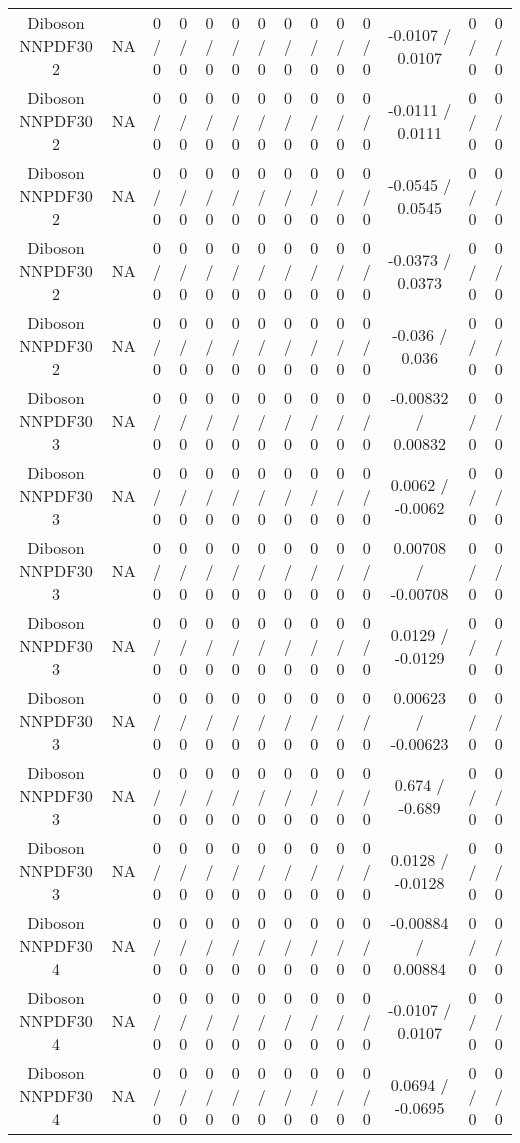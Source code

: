 \documentclass[10pt]{article}
\begin{document}
\begin{table}[htbp]
\begin{center}
\begin{tabular}{|c|c|c|c|c|c|c|c|c|c|c|c|c|c|}
  Diboson NNPDF30 2 &    NA    & 0 / 0 & 0 / 0 & 0 / 0 & 0 / 0 & 0 / 0 & 0 / 0 & 0 / 0 & 0 / 0 & 0 / 0 & -0.0107 / 0.0107 & 0 / 0 & 0 / 0 \\ 
  Diboson NNPDF30 2 &    NA    & 0 / 0 & 0 / 0 & 0 / 0 & 0 / 0 & 0 / 0 & 0 / 0 & 0 / 0 & 0 / 0 & 0 / 0 & -0.0111 / 0.0111 & 0 / 0 & 0 / 0 \\ 
  Diboson NNPDF30 2 &    NA    & 0 / 0 & 0 / 0 & 0 / 0 & 0 / 0 & 0 / 0 & 0 / 0 & 0 / 0 & 0 / 0 & 0 / 0 & -0.0545 / 0.0545 & 0 / 0 & 0 / 0 \\ 
  Diboson NNPDF30 2 &    NA    & 0 / 0 & 0 / 0 & 0 / 0 & 0 / 0 & 0 / 0 & 0 / 0 & 0 / 0 & 0 / 0 & 0 / 0 & -0.0373 / 0.0373 & 0 / 0 & 0 / 0 \\ 
  Diboson NNPDF30 2 &    NA    & 0 / 0 & 0 / 0 & 0 / 0 & 0 / 0 & 0 / 0 & 0 / 0 & 0 / 0 & 0 / 0 & 0 / 0 & -0.036 / 0.036 & 0 / 0 & 0 / 0 \\ 
  Diboson NNPDF30 3 &    NA    & 0 / 0 & 0 / 0 & 0 / 0 & 0 / 0 & 0 / 0 & 0 / 0 & 0 / 0 & 0 / 0 & 0 / 0 & -0.00832 / 0.00832 & 0 / 0 & 0 / 0 \\ 
  Diboson NNPDF30 3 &    NA    & 0 / 0 & 0 / 0 & 0 / 0 & 0 / 0 & 0 / 0 & 0 / 0 & 0 / 0 & 0 / 0 & 0 / 0 & 0.0062 / -0.0062 & 0 / 0 & 0 / 0 \\ 
  Diboson NNPDF30 3 &    NA    & 0 / 0 & 0 / 0 & 0 / 0 & 0 / 0 & 0 / 0 & 0 / 0 & 0 / 0 & 0 / 0 & 0 / 0 & 0.00708 / -0.00708 & 0 / 0 & 0 / 0 \\ 
  Diboson NNPDF30 3 &    NA    & 0 / 0 & 0 / 0 & 0 / 0 & 0 / 0 & 0 / 0 & 0 / 0 & 0 / 0 & 0 / 0 & 0 / 0 & 0.0129 / -0.0129 & 0 / 0 & 0 / 0 \\ 
  Diboson NNPDF30 3 &    NA    & 0 / 0 & 0 / 0 & 0 / 0 & 0 / 0 & 0 / 0 & 0 / 0 & 0 / 0 & 0 / 0 & 0 / 0 & 0.00623 / -0.00623 & 0 / 0 & 0 / 0 \\ 
  Diboson NNPDF30 3 &    NA    & 0 / 0 & 0 / 0 & 0 / 0 & 0 / 0 & 0 / 0 & 0 / 0 & 0 / 0 & 0 / 0 & 0 / 0 & 0.674 / -0.689 & 0 / 0 & 0 / 0 \\ 
  Diboson NNPDF30 3 &    NA    & 0 / 0 & 0 / 0 & 0 / 0 & 0 / 0 & 0 / 0 & 0 / 0 & 0 / 0 & 0 / 0 & 0 / 0 & 0.0128 / -0.0128 & 0 / 0 & 0 / 0 \\ 
  Diboson NNPDF30 4 &    NA    & 0 / 0 & 0 / 0 & 0 / 0 & 0 / 0 & 0 / 0 & 0 / 0 & 0 / 0 & 0 / 0 & 0 / 0 & -0.00884 / 0.00884 & 0 / 0 & 0 / 0 \\ 
  Diboson NNPDF30 4 &    NA    & 0 / 0 & 0 / 0 & 0 / 0 & 0 / 0 & 0 / 0 & 0 / 0 & 0 / 0 & 0 / 0 & 0 / 0 & -0.0107 / 0.0107 & 0 / 0 & 0 / 0 \\ 
  Diboson NNPDF30 4 &    NA    & 0 / 0 & 0 / 0 & 0 / 0 & 0 / 0 & 0 / 0 & 0 / 0 & 0 / 0 & 0 / 0 & 0 / 0 & 0.0694 / -0.0695 & 0 / 0 & 0 / 0 \\ 

\end{tabular}
\end{center}
\end{table}
\end{document}

